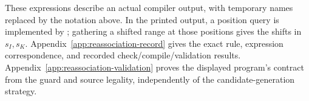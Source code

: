 These expressions describe an actual compiler output, with temporary
names replaced by the notation above. In the printed output, a position
query is implemented by ; gathering a shifted
range at those positions gives the shifts in $s_I,s_K$.
Appendix~\ref{app:reassociation-record} gives the exact rule, expression
correspondence, and recorded check/compile/validation results.
Appendix~\ref{app:reassociation-validation} proves the displayed program's
contract from the guard and source legality, independently of the
candidate-generation strategy.

